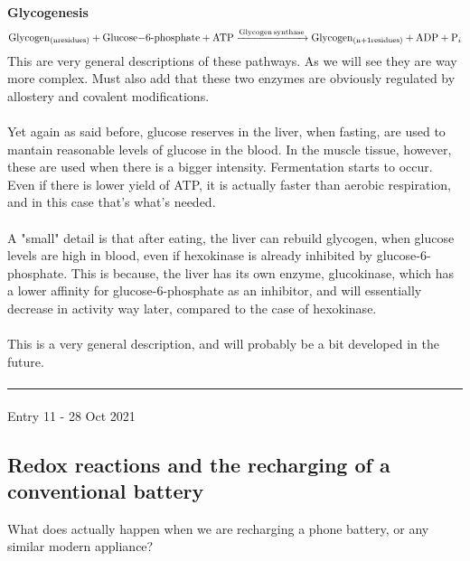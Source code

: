 \documentclass[12pt,  letterpaper]{article}
\begin{document}
\paragraph*{}
\textbf{Glycogenesis}
\begin{equation}
\ce{Glycogen_{(n\,residues)} + Glucose-6-phosphate + ATP ->[Glycogen synthase] Glycogen_{(n+1\,residues)} + ADP + P_{i}}
\end{equation}
This are very general descriptions of these pathways. As we will see they are way more complex. Must also add that these two enzymes are obviously regulated by allostery and covalent modifications.
\paragraph*{}
Yet again as said before, glucose reserves in the liver, when fasting, are used to mantain reasonable levels of glucose in the blood. In the muscle tissue, however, these are used when there is a bigger intensity. Fermentation starts to occur. Even if there is lower yield of ATP, it is actually faster than aerobic respiration, and in this case that's what's needed. \paragraph*{}
A "small" detail is that after eating, the liver can rebuild glycogen, when glucose levels are high in blood, even if hexokinase is already inhibited by glucose-6-phosphate. This is because, the liver has its own enzyme, glucokinase, which has a lower affinity for glucose-6-phosphate as an inhibitor, and will essentially decrease in activity way later, compared to the case of hexokinase.\paragraph*{}
This is a very general description, and will probably be a bit developed in the future.
\paragraph*{}
\hrule
\paragraph*{}
Entry 11 - 28 Oct 2021
\subsection*{Redox reactions and the recharging of a conventional battery}
What does actually happen when we are recharging a phone battery, or any similar modern appliance?
\end{document}
